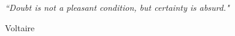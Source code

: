\pagestyle{empty} %

\null\vfill %

\textit{``Doubt is not a pleasant condition, but certainty is absurd."}

\begin{flushright}
Voltaire
\end{flushright}

\vfill\vfill\vfill\vfill\vfill\vfill\null %

\clearpage %
